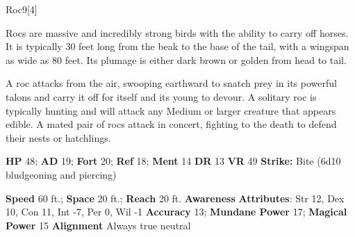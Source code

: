   
  \begin{monsection}{Roc}{9}[4]
    \vspace{-1em}\vspace{-1em}
    \vspace{0em}

    
      Rocs are massive and incredibly strong birds with the ability to carry off horses.
      It is typically 30 feet long from the beak to the base of the tail, with a wingspan as wide as 80 feet.
      Its plumage is either dark brown or golden from head to tail.

      A roc attacks from the air, swooping earthward to snatch prey in its powerful talons and carry it off for itself and its young to devour.
      A solitary roc is typically hunting and will attack any Medium or larger creature that appears edible.
      A mated pair of rocs attack in concert, fighting to the death to defend their nests or hatchlings.
    
    

    \begin{spellcontent}
      \begin{spelltargetinginfo}
        \pari \textbf{HP} 48;
          \textbf{AD} 19;
          \textbf{Fort} 20;
          \textbf{Ref} 18;
          \textbf{Ment} 14
        \pari \textbf{DR} 13
        \pari \textbf{VR} 49
        \pari \textbf{Strike:}
            Bite  (6d10 bludgeoning and piercing)
      \end{spelltargetinginfo}
    \end{spellcontent}
    \begin{monsterfooter}
      \pari \textbf{Speed} 60 ft.;
        \textbf{Space} 20 ft.;
        \textbf{Reach} 20 ft.
      \pari \textbf{Awareness} 
      \pari \textbf{Attributes}:
        Str 12, Dex 10,
        Con 11, Int -7,
        Per 0, Wil -1
      \pari \textbf{Accuracy} 13;
        \textbf{Mundane Power} 17;
      \textbf{Magical Power} 15
      \pari \textbf{Alignment} Always true neutral
    \end{monsterfooter}
  \end{monsection}
  
